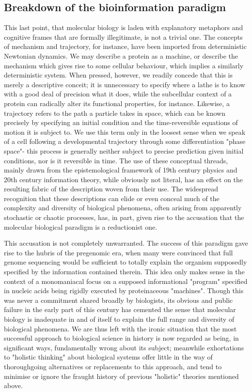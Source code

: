 \subsection{Breakdown of the bioinformation paradigm}


This last point, that molecular biology is laden with explanatory metaphors and cognitive frames that are formally illegitimate, is not a trivial one. The concepts of mechanism and trajectory, for instance, have been imported from deterministic Newtonian dynamics. We may describe a protein as a machine, or describe the mechanism which gives rise to some cellular behaviour, which implies a similarly deterministic system. When pressed, however, we readily concede that this is merely a descriptive conceit; it is unnecessary to specify where a lathe is to know with a good deal of precision what it does, while the subcellular context of a protein can radically alter its functional properties, for instance. Likewise, a trajectory refers to the path a particle takes in space, which can be known precisely by specifying an initial condition and the time-reversible equations of motion it is subject to. We use this term only in the loosest sense when we speak of a cell following a developmental trajectory through some differentiation "phase space"- this process is generally neither subject to precise prediction given initial conditions, nor is it reversible in time. The use of these conceptual threads, mainly drawn from the epistemological framework of 19th century physics and 20th century information theory, while obviously not literal, has an effect on the resulting fabric of the description woven from their use. The widespread recognition that these descriptions can elide or even conceal much of the complexity and diversity of biological phenomena, often arising from apparently stochastic or chaotic processes, has, in part, given rise to the accusation that the molecular biological paradigm is a reductionist one.

This accusation is not completely unwarranted. The success of this paradigm gave rise to the hubris of the pregenomic era, when many were convinced that full genome sequencing would be sufficient to totally explain the organism supposedly specified by the information contained therein. This idea only makes sense in the context of a monomaniacal focus on a supposed informational "program" specified in nucleic acids being rigidly executed by proteinaceous "machines". Though this was never a commitment shared broadly by biologists, its obvious and public failure in the early part of this century has cemented the sense that molecular biology is inadequate in and of itself to explain the full range and diversity of biological phenomena. We are thus left with the ironic situation that the most successful approach to biological science in history is now regarded as being, in significant ways, fundamentally wrong about its subject; meanwhile exhortations to "holistic thinking" about biological systems offer little in the way of thoroughgoing alternatives or replacements to this approach, and tend to minimise or ignore the fraught history of previous "holistic" theories mentioned above.

